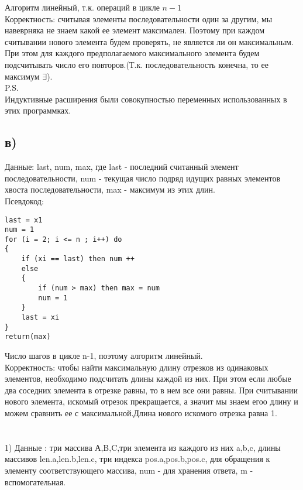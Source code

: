 \documentclass[a4paper,12pt]{article} %
\begin{document}
Алгоритм линейный, т.к. операций в цикле $ n-1$\\
Корректность: считывая элементы последовательности один за другим, мы навеврняка не знаем какой ее элемент максимален. Поэтому при каждом считывании нового элемента будем проверять, не является ли он максимальным. При этом для каждого предполагаемого максимального элемента будем подсчитывать число его повторов.(Т.к. последовательность конечна, то ее максимум $\exists$).\\
P.S. \\
Индуктивные расширения были совокупностью переменных использованных в этих программках.



\subsection*{в)}
Данные: last, num, max, где last - последний считанный элемент последовательности, num - текущая число подряд идущих равных элементов хвоста последовательности, max - максимум из этих длин.\\

Псевдокод:\\
\begin{lstlisting}
last = x1
num = 1
for (i = 2; i <= n ; i++) do
{
	if (xi == last) then num ++
	else
	{
		if (num > max) then max = num
		num = 1
	}
	last = xi
}
return(max)
\end{lstlisting}

Число шагов в цикле n-1, поэтому алгоритм линейный.\\

Корректность: чтобы найти максимальную длину отрезков из одинаковых элементов, необходимо подсчитать длины каждой из них. При этом если любые два соседних элемента в отрезке равны, то в нем все они равны. При считывании нового элемента, искомый отрезок прекращается, а значит мы знаем егоо длину и можем сравнить ее с максимальной.Длина нового искомого отрезка равна 1. 

\section{}

1) Данные : три массива А,B,C,три элемента из каждого из них a,b,c, длины массивов len.a,len.b,len.c, три индекса pos.a,pos.b,pos.c, для обращения к элементу соответствующего массива, num - для хранения ответа, m - вспомогательная.\\
\end{document}
